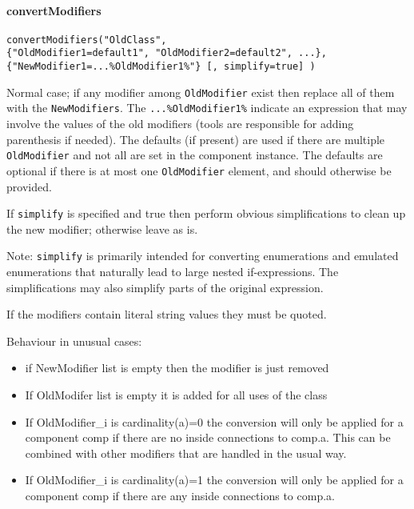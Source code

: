 \paragraph*{convertModifiers}

\begin{lstlisting}[language=modelica]
convertModifiers("OldClass",
{"OldModifier1=default1", "OldModifier2=default2", ...},
{"NewModifier1=...%OldModifier1%"} [, simplify=true] )
\end{lstlisting}

Normal case; if any modifier among \lstinline!OldModifier! exist then replace all of
them with the \lstinline!NewModifiers!. The \lstinline!...%OldModifier1%! indicate an expression that may
involve the values of the old modifiers (tools are responsible for adding parenthesis if needed).
The defaults (if present) are used if there
are multiple \lstinline!OldModifier! and not all are set in the component instance.
The defaults are optional if there is at most one \lstinline!OldModifier! element, and should otherwise be provided.

If \lstinline!simplify! is specified and true then perform obvious simplifications
to clean up the new modifier; otherwise leave as is.
\begin{nonnormative}
Note: \lstinline!simplify! is primarily intended for converting enumerations and emulated
enumerations that naturally lead to large nested if-expressions. The
simplifications may also simplify parts of the original expression.
\end{nonnormative}

If the modifiers contain literal string values they must be quoted.

Behaviour in unusual cases:

\begin{itemize}
\item
  if NewModifier list is empty then the modifier is just removed
\item
  If OldModifer list is empty it is added for all uses of the class
\item
  If OldModifier\_i is cardinality(a)=0 the conversion will only be
  applied for a component comp if there are no inside connections to
  comp.a. This can be combined with other modifiers that are handled in
  the usual way.
\item
  If OldModifier\_i is cardinality(a)=1 the conversion will only be
  applied for a component comp if there are any inside connections to
  comp.a.
\end{itemize}

